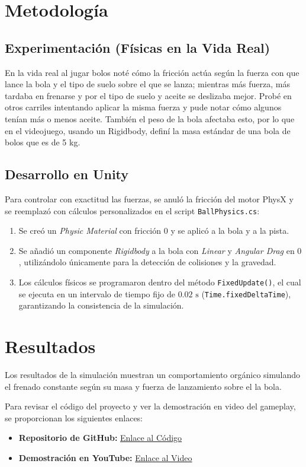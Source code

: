 \documentclass[11pt,letterpaper,twocolumn]{article}
\begin{document}
\section{Metodología}

\subsection{Experimentación (Físicas en la Vida Real)}
En la vida real al jugar bolos noté cómo la fricción actúa según la fuerza con que lance la bola y el tipo de suelo sobre el que se lanza; mientras más fuerza, más tardaba en frenarse y por el tipo de suelo y aceite se deslizaba mejor. Probé en otros carriles intentando aplicar la misma fuerza y pude notar cómo algunos tenían más o menos aceite. También el peso de la bola afectaba esto, por lo que en el videojuego, usando un Rigidbody, definí la masa estándar de una bola de bolos que es de 5 kg.

\subsection{Desarrollo en Unity}
Para controlar con exactitud las fuerzas, se anuló la fricción del motor PhysX y se reemplazó con cálculos personalizados en el script \texttt{BallPhysics.cs}:
\begin{enumerate}
    \item Se creó un \textit{Physic Material} con fricción $0$ y se aplicó a la bola y a la pista.
    \item Se añadió un componente \textit{Rigidbody} a la bola con \textit{Linear} y \textit{Angular Drag} en $0$, utilizándolo únicamente para la detección de colisiones y la gravedad.
    \item Los cálculos físicos se programaron dentro del método \texttt{FixedUpdate()}, el cual se ejecuta en un intervalo de tiempo fijo de $0.02\text{ s}$ (\texttt{Time.fixedDeltaTime}), garantizando la consistencia de la simulación.
\end{enumerate}

\section{Resultados}
Los resultados de la simulación muestran un comportamiento orgánico simulando el frenado constante según su masa y fuerza de lanzamiento sobre el la bola.

Para revisar el código del proyecto y ver la demostración en video del gameplay, se proporcionan los siguientes enlaces:
\begin{itemize}
    \item \textbf{Repositorio de GitHub:} \href{https://github.com/ZarekSaleme/Physics_Bowling_Game}{Enlace al Código}
    \item \textbf{Demostración en YouTube:} \href{https://youtube.com/watch?v=FisicaBowlingZarek}{Enlace al Video}
\end{itemize}
\end{document}

